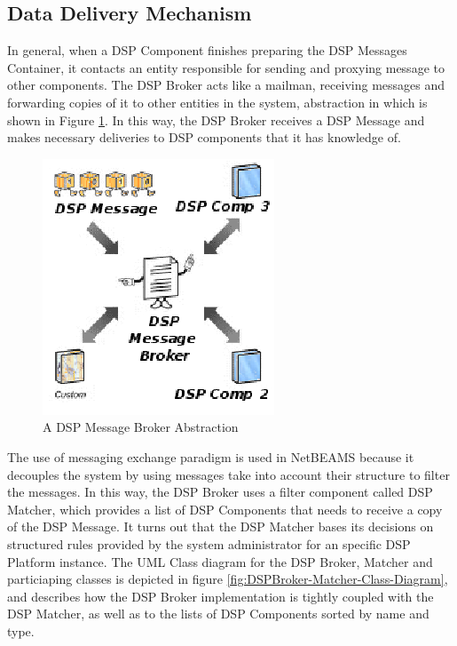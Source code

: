 \newpage

\subsection{Data Delivery Mechanism}

In general, when a DSP Component finishes preparing the DSP Messages Container,
it contacts an entity responsible for sending and proxying message to other
components. The DSP Broker acts like a mailman, receiving messages and
forwarding copies of it to other entities in the system, abstraction in which
is shown in Figure \ref{fig:DSP-Message-Broker-Abstraction}. In this way, the
DSP Broker receives a DSP Message and makes necessary deliveries to DSP
components that it has knowledge of.

\begin{figure}[!h]
  \centering
  \includegraphics[scale=0.8]{../diagrams/DSP-Message-Broker-Abstraction}
  \caption{A DSP Message Broker Abstraction}
  \label{fig:DSP-Message-Broker-Abstraction}
\end{figure}

The use of messaging exchange paradigm is used in NetBEAMS because it decouples
the system by using messages take into account their structure to filter the
messages. In this way, the DSP Broker uses a filter component called DSP
Matcher, which provides a list of DSP Components that needs to receive a copy
of the DSP Message. It turns out that the DSP Matcher bases its decisions on
structured rules provided by the system administrator for an specific DSP
Platform instance. The UML Class diagram for the DSP Broker, Matcher and
particiaping classes is depicted in figure
\ref{fig:DSPBroker-Matcher-Class-Diagram}, and describes how the DSP Broker
implementation is tightly coupled with the DSP Matcher, as well as to the
lists of DSP Components sorted by name and type.

